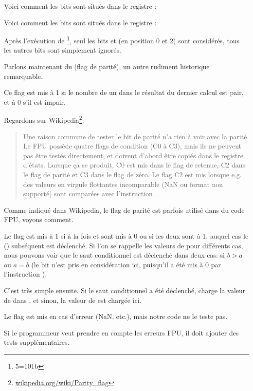 Voici comment les bits \CThreeBits sont situés dans le registre \AX:



Voici comment les bits \CThreeBits sont situés dans le registre \AH:



Après l'exécution de \footnote{5=101b}, seul les bits \Czero et \Ctwo
(en position 0 et 2) sont considérés, tous les autres bits sont simplement ignorés.

\label{parity_flag}

Parlons maintenant du  (flag de parité), un autre rudiment historique
remarquable.

Ce flag est mis à 1 si le nombre de un dans le résultat du dernier calcul est pair,
et à 0 s'il est impair.

Regardons sur Wikipedia\footnote{\href{http://go.yurichev.com/17131}{wikipedia.org/wiki/Parity\_flag}}:

\begin{framed}
\begin{quotation}
Une raison commune de tester le bit de parité n'a rien à voir avec la parité. Le FPU
possède quatre flags de condition (C0 à C3), mais ils ne peuvent pas être testés
directement, et doivent d'abord être copiés dans le registre d'états.
Lorsque ça se produit, C0 est mis dans le flag de retenue, C2 dans le flag
de parité et C3 dans le flag de zéro.
Le flag C2 est mis lorsque e.g. des valeurs en virgule flottantes incomparable
(NaN ou format non supporté) sont comparées avec l'instruction \FUCOM.
\end{quotation}
\end{framed}

Comme indiqué dans Wikipedia, le flag de parité est parfois utilisé dans du code
FPU, voyons comment.


Le flag \PF est mis à 1 si à la fois \Czero et \Ctwo sont mis à 0 ou si les deux
sont à 1, auquel cas le \JP () subséquent est déclenché.
Si l'on se rappelle les valeurs de \CThreeBits pour différents cas, nous pouvons
voir que le saut conditionnel \JP est déclenché dans deux cas: si $b>a$ ou $a=b$
(le bit \Cthree n'est pris en considération ici, puisqu'il a été mis à 0 par l'instruction
).

C'est très simple ensuite.
Si le saut conditionnel a été déclenché, \FLD charge la valeur de  dans
, et sinon, la valeur de  est chargée ici.


Le flag \Ctwo est mis en cas d'erreur (\gls{NaN}, etc.), mais notre code ne le teste
pas.

Si le programmeur veut prendre en compte les erreurs FPU, il doit ajouter des tests
supplémentaires.


